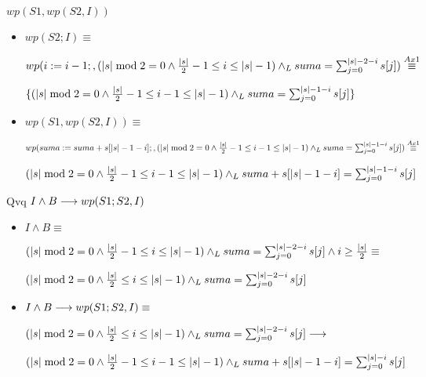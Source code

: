 \documentclass{article}
\begin{document}
$wp(S1, wp(S2, I))$

\begin{itemize}
    \item $wp(S2; I) \equiv$

    $wp(i:= i-1;, (|s| \bmod 2 = 0 \wedge \frac{|s|}{2} - 1 \leq i \leq |s| - 1) \land _L suma = \sum_{j=0}^{|s|-2-i} s[j]) \stackrel{Ax1}{\equiv}$

    $\{(|s| \bmod 2 = 0 \wedge \frac{|s|}{2} - 1 \leq i - 1 \leq |s| - 1) \land _L suma = \sum_{j=0}^{|s|-1-i} s[j]\}$

    \item $wp(S1, wp(S2, I)) \equiv$

    $wp(suma := suma + s[|s|-1-i];, (|s| \bmod 2 = 0 \wedge \frac{|s|}{2} - 1 \leq i - 1 \leq |s| - 1) \land _L suma = \sum_{j=0}^{|s|-1-i} s[j])\stackrel{Ax1}{\equiv}$

    $ (|s| \bmod 2 = 0 \wedge \frac{|s|}{2} - 1 \leq i - 1 \leq |s| - 1) \land _L suma + s[|s|-1-i] = \sum_{j=0}^{|s|-1-i} s[j]$

\end{itemize}

Qvq $I \wedge B \longrightarrow wp(S1;S2, I)$

\begin{itemize}
    \item $I \wedge B \equiv$

    $ (|s| \bmod 2 = 0 \wedge \frac{|s|}{2} - 1 \leq i \leq |s| - 1) \land _L suma = \sum_{j=0}^{|s|-2-i} s[j] \wedge i \geq \frac{|s|}{2} \equiv$

    $ (|s| \bmod 2 = 0 \wedge \frac{|s|}{2} \leq i \leq |s| - 1) \land _L suma = \sum_{j=0}^{|s|-2-i} s[j] $

    \item $I \wedge B \longrightarrow wp(S1;S2, I) \equiv$

    $ (|s| \bmod 2 = 0 \wedge \frac{|s|}{2} \leq i \leq |s| - 1) \land _L suma = \sum_{j=0}^{|s|-2-i} s[j] \longrightarrow$

    $ (|s| \bmod 2 = 0 \wedge \frac{|s|}{2} - 1 \leq i - 1 \leq |s| - 1) \land _L suma + s[|s|-1-i] = \sum_{j=0}^{|s|-i} s[j] $

\end{itemize}
\end{document}

